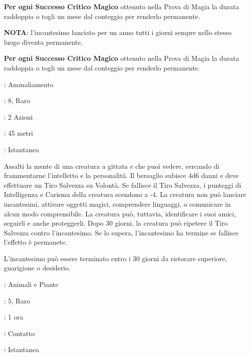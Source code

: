 \begin{multicols}{2}
\textbf{Per ogni Successo Critico Magico} ottenuto nella Prova di Magia la durata raddoppia o togli un mese dal conteggio per renderlo permanente.

\textbf{NOTA}: l'incantesimo lanciato per un anno tutti i giorni sempre nello stesso luogo diventa permanente.

\textbf{Per ogni Successo Critico Magico} ottenuto nella Prova di Magia la durata raddoppia o togli un mese dal conteggio per renderlo permanente.

\noindent\colorbox{OBSSgold!10}{
\begin{minipage}{0.95\linewidth}
\begin{description}[noitemsep, topsep=0pt, parsep=0pt, partopsep=0pt, leftmargin=0cm, labelwidth=1.3cm]
	\item[\textbf{Lista}]: Ammaliamento
	\item[\textbf{Livello}]: 8, Raro
	\item[\textbf{Lancio}]: 2 Azioni
	\item[\textbf{Gittata}]: 45 metri
	\item[\textbf{Durata}]: Istantanea
\end{description}
\end{minipage}}\smallskip

Assalti la mente di una creatura a gittata e che puoi vedere, cercando di frammentarne l'intelletto e la personalità. Il bersaglio subisce 4d6 danni e deve effettuare un Tiro Salvezza su Volontà. Se fallisce il Tiro Salvezza, i punteggi di Intelligenza e Carisma della creatura scendono a -4. La creatura non può lanciare incantesimi, attivare oggetti magici, comprendere linguaggi, o comunicare in alcun modo comprensibile. La creatura può, tuttavia, identificare i suoi amici, seguirli e anche proteggerli. Dopo 30 giorni, la creatura può ripetere il Tiro Salvezza contro l'incantesimo. Se lo supera, l'incantesimo ha termine se fallisce l'effetto è permanete.

L'incantesimo può essere terminato entro i 30 giorni da ristorare superiore, guarigione o desiderio.

\noindent\colorbox{OBSSgold!10}{
\begin{minipage}{0.95\linewidth}
\begin{description}[noitemsep, topsep=0pt, parsep=0pt, partopsep=0pt, leftmargin=0cm, labelwidth=1.3cm]
	\item[\textbf{Lista}]: Animali e Piante
	\item[\textbf{Livello}]: 5, Raro
	\item[\textbf{Lancio}]: 1 ora
	\item[\textbf{Gittata}]: Contatto
	\item[\textbf{Durata}]: Istantanea
\end{description}
\end{minipage}}\smallskip


\end{multicols}
